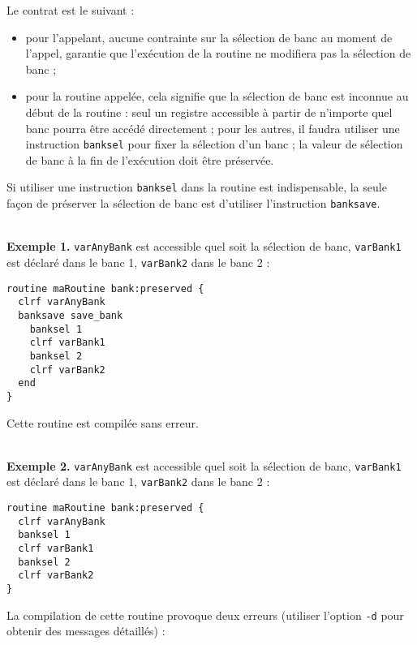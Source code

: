 
Le contrat est le suivant :
\begin{itemize}
  \item pour l'appelant, aucune contrainte sur la sélection de banc au moment de l'appel, garantie que l'exécution de la routine ne modifiera pas la sélection de banc ; 
\item pour la routine appelée, cela signifie que la sélection de banc est inconnue au début de la routine : seul un registre accessible à partir de n'importe quel banc pourra être accédé directement ; pour les autres, il faudra utiliser une instruction \texttt{banksel} pour fixer la sélection d'un banc ; la valeur de sélection de banc à la fin de l'exécution doit être préservée.
\end{itemize}

Si utiliser une instruction \texttt{banksel} dans la routine est indispensable, la seule façon de préserver la sélection de banc est d'utiliser l'instruction \texttt{banksave}. 

~\\
\textbf{Exemple 1.} \texttt{varAnyBank} est accessible quel soit la sélection de banc, \texttt{varBank1} est déclaré dans le banc 1, \texttt{varBank2} dans le banc 2 :
\begin{lstlisting}[language=piccolo]
routine maRoutine bank:preserved {
  clrf varAnyBank
  banksave save_bank
    banksel 1
    clrf varBank1
    banksel 2
    clrf varBank2
  end
}
\end{lstlisting}

Cette routine est compilée sans erreur.


~\\
\textbf{Exemple 2.} \texttt{varAnyBank} est accessible quel soit la sélection de banc, \texttt{varBank1} est déclaré dans le banc 1, \texttt{varBank2} dans le banc 2 :
\begin{lstlisting}[language=piccolo]
routine maRoutine bank:preserved {
  clrf varAnyBank
  banksel 1
  clrf varBank1
  banksel 2
  clrf varBank2
}
\end{lstlisting}

La compilation de cette routine provoque deux erreurs (utiliser l’option \texttt{-d} pour obtenir des messages détaillés) :

